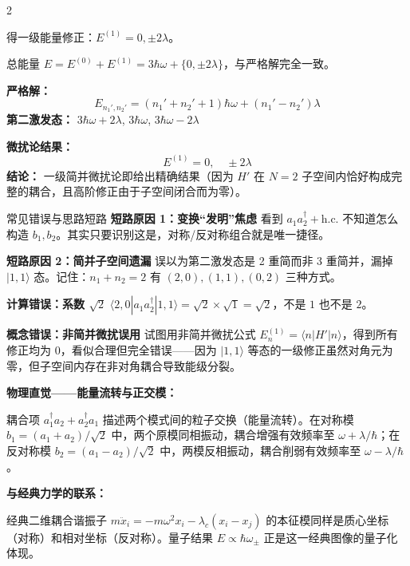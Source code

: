\begin{multicols}{2}
\begin{derivationbox}[标准解题过程]
得一级能量修正：$E^{(1)} = 0, \pm 2\lambda$。

总能量 $E = E^{(0)} + E^{(1)} = 3\hbar\omega + \{0, \pm 2\lambda\}$，与严格解完全一致。
\end{derivationbox}

\begin{formulabox}[核心结论]
\textbf{严格解：}
\[
E_{n_1', n_2'} = (n_1' + n_2' + 1)\hbar\omega + (n_1' - n_2')\lambda
\]
\textbf{第二激发态：} $3\hbar\omega + 2\lambda$, $3\hbar\omega$, $3\hbar\omega - 2\lambda$

\textbf{微扰论结果：}
\[
E^{(1)} = 0, \quad \pm 2\lambda
\]
\textbf{结论：} 一级简并微扰论即给出精确结果（因为 $H'$ 在 $N=2$ 子空间内恰好构成完整的耦合，且高阶修正由于子空间闭合而为零）。
\end{formulabox}

\begin{errorbox}[colback=white]{常见错误与思路短路}
\textbf{短路原因 1：变换``发明''焦虑}
看到 $a_1 a_2^\dagger + \text{h.c.}$ 不知道怎么构造 $b_1, b_2$。其实只要识别这是，对称/反对称组合就是唯一捷径。

\textbf{短路原因 2：简并子空间遗漏}
误以为第二激发态是 2 重简而非 3 重简并，漏掉 $|1,1\rangle$ 态。记住：$n_1+n_2=2$ 有 $(2,0), (1,1), (0,2)$ 三种方式。

\textbf{计算错误：系数 $\sqrt{2}$}
$\langle 2,0 | a_1 a_2^\dagger | 1,1 \rangle = \sqrt{2} \times \sqrt{1} = \sqrt{2}$，不是 $1$ 也不是 $2$。

\textbf{概念错误：非简并微扰误用}
试图用非简并微扰公式 $E_n^{(1)} = \langle n | H' | n \rangle$，得到所有修正均为 $0$，看似合理但完全错误——因为 $|1,1\rangle$ 等态的一级修正虽然对角元为零，但子空间内存在非对角耦合导致能级分裂。
\end{errorbox}

\begin{insightbox}[举一反三与物理直觉]
\textbf{物理直觉——能量流转与正交模：}

耦合项 $a_1^\dagger a_2 + a_2^\dagger a_1$ 描述两个模式间的粒子交换（能量流转）。在对称模 $b_1 = (a_1+a_2)/\sqrt{2}$ 中，两个原模同相振动，耦合增强有效频率至 $\omega + \lambda/\hbar$；在反对称模 $b_2 = (a_1-a_2)/\sqrt{2}$ 中，两模反相振动，耦合削弱有效频率至 $\omega - \lambda/\hbar$。

\textbf{与经典力学的联系：}

经典二维耦合谐振子 $m\ddot{x}_i = -m\omega^2 x_i - \lambda_c (x_i - x_j)$ 的本征模同样是质心坐标（对称）和相对坐标（反对称）。量子结果 $E \propto \hbar\omega_{\pm}$ 正是这一经典图像的量子化体现。


\end{insightbox}
\end{multicols}

